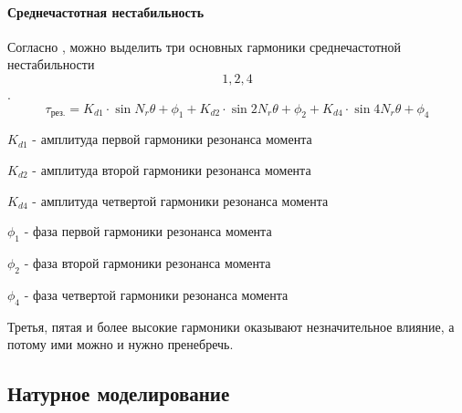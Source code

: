 
\paragraph{ Среднечастотная нестабильность }
Согласно \cite[ур. (5)]{Novel_Modeling_and_Damping}, можно выделить три основных
гармоники среднечастотной нестабильности \[1, 2, 4\].
\begin{equation}
    \tau_{\text{рез.}} =   K_{d1} \cdot \sin{   N_{r} \theta + \phi_{1} }
                         + K_{d2} \cdot \sin{ 2 N_{r} \theta + \phi_{2} }
                         + K_{d4} \cdot \sin{ 4 N_{r} \theta + \phi_{4} }
\end{equation}

$K_{d1}$ - амплитуда первой гармоники резонанса момента

$K_{d2}$ - амплитуда второй гармоники резонанса момента

$K_{d4}$ - амплитуда четвертой гармоники резонанса момента

$\phi_{1}$ - фаза первой гармоники резонанса момента

$\phi_{2}$ - фаза второй гармоники резонанса момента

$\phi_{4}$ - фаза четвертой гармоники резонанса момента

Третья, пятая и более высокие гармоники оказывают незначительное влияние, а потому
ими можно и нужно пренебречь.

\newpage
\subsection{Натурное моделирование}

\endinput

